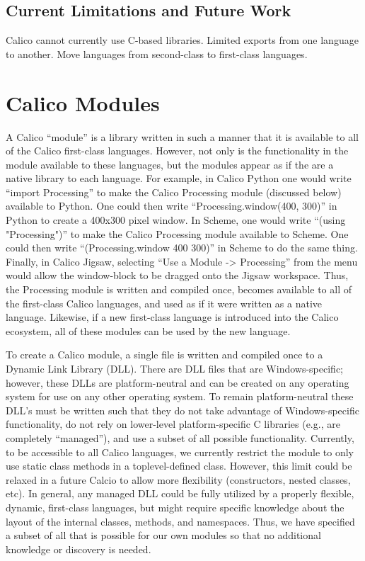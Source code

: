 \documentclass[preprint]{sigplanconf}
\begin{document}
\subsection{Current Limitations and Future Work}


Calico cannot currently use C-based libraries.
Limited exports from one language to another.
Move languages from second-class to first-class languages.


\section{Calico Modules}


A Calico ``module'' is a library written in such a manner that it is available to all of the Calico first-class languages. However, not only is the functionality in the module available to these languages, but the modules appear as if the are a native library to each language. For example, in Calico Python one would write ``import Processing'' to make the Calico Processing module (discussed below) available to Python. One could then write ``Processing.window(400, 300)'' in Python to create a 400x300 pixel window. In Scheme, one would write ``(using "Processing")'' to make the Calico Processing module available to Scheme. One could then write ``(Processing.window 400 300)'' in Scheme to do the same thing. Finally, in Calico Jigsaw, selecting ``Use a Module -> Processing'' from the menu would allow the window-block to be dragged onto the Jigsaw workspace. Thus, the Processing module is written and compiled once, becomes available to all of the first-class Calico languages, and used as if it were written as a native language. Likewise, if a new first-class language is introduced into the Calico ecosystem, all of these modules can be used by the new language.


To create a Calico module, a single file is written and compiled once to a Dynamic Link Library (DLL). There are DLL files that are Windows-specific; however, these DLLs are platform-neutral and can be created on any operating system for use on any other operating system. To remain platform-neutral these DLL's must be written such that they do not take advantage of Windows-specific functionality, do not rely on lower-level platform-specific C libraries (e.g., are completely ``managed''), and use a subset of all possible functionality. Currently, to be accessible to all Calico languages, we currently restrict the module to only use static class methods in a toplevel-defined class. However, this limit could be relaxed in a future Calcio to allow more flexibility (constructors, nested classes, etc). In general, any managed DLL could be fully utilized by a properly flexible, dynamic, first-class languages, but might require specific knowledge about the layout of the internal classes, methods, and namespaces. Thus, we have specified a subset of all that is possible for our own modules so that no additional knowledge or discovery is needed.
\end{document}
